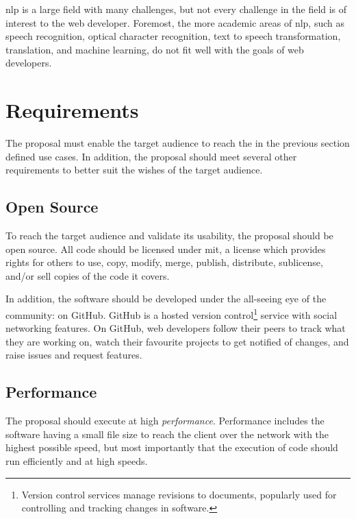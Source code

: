 \noindent \gls{nlp} is a large field with many challenges, but not every
  challenge in the field is of interest to the web developer.
Foremost, the more academic areas of \gls{nlp}, such as speech recognition,
  optical character recognition, text to speech transformation, translation,
  and machine learning, do not fit well with the goals of web developers.

\section{Requirements}\label{requirements}

The proposal must enable the target audience to reach the in the previous
  section defined use cases.
In addition, the proposal should meet several other requirements to better
  suit the wishes of the target audience.

\subsection{Open Source}\label{open-source}

To reach the target audience and validate its usability, the proposal
  should be open source.
All code should be licensed under \acrshort{mit}, a license which
  provides rights for others to use, copy, modify, merge, publish,
  distribute, sublicense, and\slash or sell copies of the code it covers.

In addition, the software should be developed under the all-seeing eye of
  the community: on GitHub.
GitHub is a hosted version control\footnote{Version
    control services manage revisions to documents, popularly used for
    controlling and tracking changes in software.} service with social
  networking features.
On GitHub, web developers follow their peers to track what they are
  working on, watch their favourite projects to get notified of changes,
  and raise issues and request features.

\subsection{Performance}\label{performance}

The proposal should execute at high \emph{performance}.
Performance includes the software having a small file size to reach the
  client over the network with the highest possible speed, but most
  importantly that the execution of code should run efficiently and at high
  speeds.

